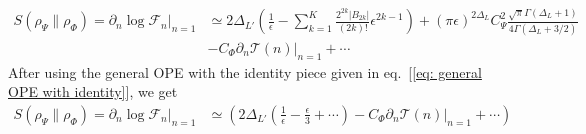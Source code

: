 \documentclass[11pt]{article}
\newcommand{\ep}{\epsilon}
\newcommand{\p}{\partial}
\newcommand{\mO}{\mathcal{O}}
\newcommand{\nn}{\nonumber}
\newcommand{\lb}{\left(}
\newcommand{\rb}{\right)}
\begin{document}
\begin{align}
    S(\rho_\Psi \| \rho_\Phi) = \p_n \log \mathcal{F}_n \big|_{n=1} & \simeq  2\Delta_{L'}\lb  \frac{1}{\ep} - \sum_{k=1}^{K} \frac{2^{2k}|B_{2k}|} {(2k)!}\ep^{2k-1}
    \rb + (\pi \ep)^{2\Delta_L}C_{\Psi}^2\frac{\sqrt{\pi}\Gamma(\Delta_L+1)}{4\Gamma(\Delta_L+3/2)}  \nn \\ &   - C_\Phi  \p_n \mathcal{T}(n)|_{n=1} + \cdots  
\end{align}
After using the general OPE with the identity piece given in eq.~[\ref{eq: general OPE with identity}], we get
\begin{align}
    S(\rho_\Psi \| \rho_\Phi) = \p_n \log \mathcal{F}_n \big|_{n=1} & \simeq  
    \lb 2\Delta_{L'}\lb  \frac{1}{\ep} - \frac{\ep}{3} + \cdots
    \rb  - C_\Phi  \p_n \mathcal{T}(n)|_{n=1} + \cdots \rb 
\end{align}







\end{document}

